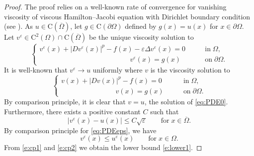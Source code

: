 \documentclass[11pt,reqno]{amsart}
\numberwithin{figure}{section}
\theoremstyle{plain}
\theoremstyle{remark}
\numberwithin{equation}{section}
\begin{document}
\begin{proof} The proof relies on a well-known rate of convergence for vanishing viscosity of viscous Hamilton--Jacobi equation with Dirichlet boundary condition (see \cite{Calder2021,crandall_two_1984,evans_adjoint_2010,fleming_convergence_1961,Tran2011}). As $u\in \mathrm{C}(\overline{\Omega})$, let $g\in \mathrm{C}(\partial\Omega)$ defined by $g(x) = u(x)$ for $x\in \partial\Omega$. Let $v^\varepsilon\in \mathrm{C}^2(\Omega)\cap \mathrm{C}(\overline{\Omega})$ be the unique viscosity solution to
\begin{equation*}
    \begin{cases}
          v^\varepsilon(x) + |Dv^\varepsilon(x)|^p - f(x) - \varepsilon \Delta v^\varepsilon(x) = 0 &\qquad\text{in}\;\Omega,\\
        \qquad\qquad\qquad\qquad\qquad \qquad\quad v^\varepsilon(x) = g(x) &\qquad\text{on}\;\partial\Omega.
    \end{cases}
\end{equation*}
It is well-known that $v^\varepsilon \to u$ uniformly where $v$ is the viscosity solution to
\begin{equation*}
\begin{cases}
       v(x) + |Dv(x)|^p - f(x) = 0 &\qquad\text{in}\;\Omega,\\
     \qquad\qquad\qquad\quad\;\;\; v(x) = g(x)&\qquad\text{on}\;\partial\Omega. 
\end{cases}
\end{equation*}
By comparison principle, it is clear that $v = u$, the solution of \eqref{eq:PDE0}. Furthermore, there exists a positive constant $C$ such that 
\begin{equation}\label{e:cp1}
     |v^\varepsilon(x)  - u(x)| \leq C\sqrt{\varepsilon} \qquad\text{for}\;x\in \overline{\Omega}.
\end{equation}
By comparison principle for \eqref{eq:PDEeps}, we have
\begin{equation}\label{e:cp2}
    v^\varepsilon(x)\leq u^\varepsilon(x) \qquad\text{for}\;x\in \Omega.
\end{equation}
From \eqref{e:cp1} and \eqref{e:cp2} we obtain the lower bound \eqref{e:lower1}.
\end{proof}

\end{document}
